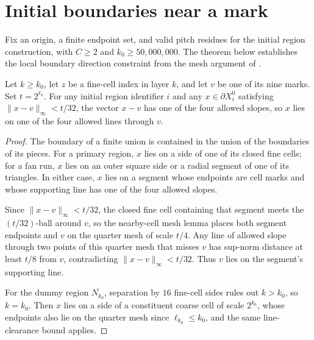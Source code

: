 \section{Initial boundaries near a mark}
\label{sec:area_law_initial_star_frontiers}

Fix an origin, a finite endpoint set, and valid pitch residues
for the initial region construction, with $C\ge2$ and
$k_0\ge50{,}000{,}000$. The theorem below establishes the local boundary
direction constraint from the mesh argument of \cite[Section~11]{OpenAI2026AreaLaw}.


\begin{lemma}
    \label{thm:area_law_initial_frontier_near_mark}
    \leanok
    Let $k\ge k_0$, let $z$ be a fine-cell index in layer $k$,
    and let $v$ be one of its nine marks. Set $t=2^{\ell_k}$.
    For any initial region identifier $i$ and any
    $x\in\partial X_i^0$ satisfying $\|x-v\|_\infty<t/32$, the vector
    $x-v$ has one of the four allowed slopes, so $x$ lies on one
    of the four allowed lines through $v$.
\end{lemma}
\begin{proof}\leanok
    The boundary of a finite union is contained in the union of the boundaries
    of its pieces. For a primary region, $x$ lies on a side of one of its
    closed fine cells; for a fan run, $x$ lies on an outer square side or a
    radial segment of one of its triangles. In either case, $x$ lies on a
    segment whose endpoints are cell marks and whose supporting line has one of
    the four allowed slopes.

    Since $\|x-v\|_\infty<t/32$, the closed fine cell containing that segment
    meets the $(t/32)$-ball around $v$, so the nearby-cell mesh lemma places
    both segment endpoints and $v$ on the quarter mesh of scale $t/4$. Any line
    of allowed slope through two points of this quarter mesh that misses $v$
    has sup-norm distance at least $t/8$ from $v$, contradicting
    $\|x-v\|_\infty<t/32$. Thus $v$ lies on the segment's supporting line.

    For the dummy region $\overline{N_{k_0}}$, separation by $16$ fine-cell
    sides rules out $k>k_0$, so $k=k_0$. Then $x$ lies on a side of a
    constituent coarse cell of scale $2^{k_0}$, whose endpoints also lie on the
    quarter mesh since $\ell_{k_0}\le k_0$, and the same line-clearance
    bound applies.
\end{proof}
